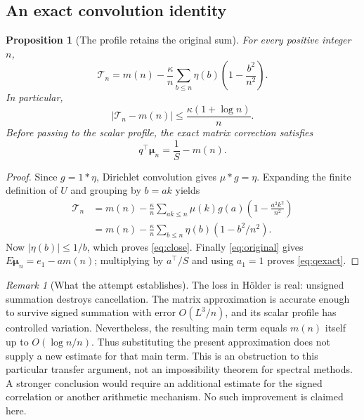 \documentclass[11pt]{article}
\newtheorem{proposition}[theorem]{Proposition}
\theoremstyle{remark}\newtheorem{remark}[theorem]{Remark}
\newcommand{\muvec}{\boldsymbol\mu}
\begin{document}
\subsection{An exact convolution identity}
\begin{proposition}[The profile retains the original sum]\label{prop:obstruction}
For every positive integer $n$,
\begin{equation}\label{eq:obstruction}
 \mathcal T_n=m(n)-\frac\kappa n\sum_{b\le n}\eta(b)
                   \left(1-\frac{b^2}{n^2}\right).
\end{equation}
In particular,
\begin{equation}\label{eq:close}
 |\mathcal T_n-m(n)|\le\frac{\kappa(1+\log n)}n.
\end{equation}
Before passing to the scalar profile, the exact matrix correction satisfies
\begin{equation}\label{eq:qexact}
 q^\top\muvec_n=\frac1S-m(n).
\end{equation}
\end{proposition}
\begin{proof}
Since $g=1*\eta$, Dirichlet convolution gives $\mu*g=\eta$. Expanding the finite definition of $U$ and grouping by $b=ak$ yields
\begin{align*}
 \mathcal T_n
 &=m(n)-\frac\kappa n\sum_{ak\le n}\mu(k)g(a)
                  \left(1-\frac{a^2k^2}{n^2}\right)\\
 &=m(n)-\frac\kappa n\sum_{b\le n}\eta(b)(1-b^2/n^2).
\end{align*}
Now $|\eta(b)|\le1/b$, which proves \eqref{eq:close}. Finally \eqref{eq:original} gives $E\muvec_n=e_1-a m(n)$; multiplying by $a^\top/S$ and using $a_1=1$ proves \eqref{eq:qexact}.
\end{proof}
\begin{remark}[What the attempt establishes]
The loss in H\"older is real: unsigned summation destroys cancellation. The matrix approximation is accurate enough to survive signed summation with error $O(L^3/n)$, and its scalar profile has controlled variation. Nevertheless, the resulting main term equals $m(n)$ itself up to $O(\log n/n)$. Thus substituting the present approximation does not supply a new estimate for that main term. This is an obstruction to this particular transfer argument, not an impossibility theorem for spectral methods. A stronger conclusion would require an additional estimate for the signed correlation or another arithmetic mechanism. No such improvement is claimed here.
\end{remark}
\end{document}
